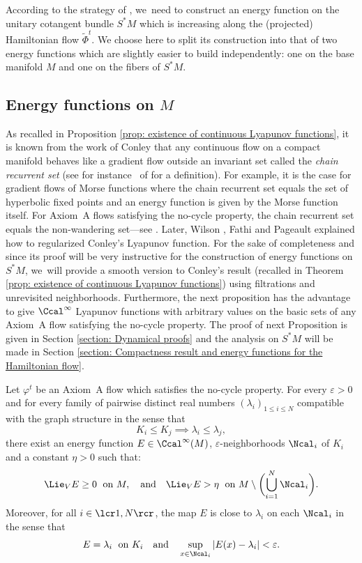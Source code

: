 According to the strategy of \cite{FS}, we~need to construct an energy function on the unitary cotangent bundle $S^*M$ which is increasing along the (projected) Hamiltonian flow $\widetilde{\Phi}^t$. We choose here to split its construction into that of two energy functions which are slightly easier to build independently: one on the base manifold $M$ and one on the fibers of $S^* M$.

\subsection{Energy functions on $M$}

As recalled in Proposition \ref{prop: existence of continuous Lyapunov functions}, it is known from the work of Conley \cite{conley} that any continuous flow on a compact manifold behaves like a gradient flow outside an invariant set called the \textit{chain recurrent set} (see for instance~\cite{palis-demelo} of \cite{FH} for a definition). For example, it is the case for gradient flows of Morse functions where the chain recurrent set equals the set of hyperbolic fixed points and an energy function is given by the Morse function itself. For Axiom~A flows satisfying the no-cycle property, the chain recurrent set equals the non-wandering set---see \cite[Th.\,5.3.47]{FH}. Later, Wilson \cite{wilson}, Fathi and Pageault \cite{fathi-pageault} explained how to regularized Conley's Lyapunov function. For the sake of completeness and since its proof will be very instructive for the construction of energy functions on $S^* M$, we~will provide a smooth version to Conley's result (recalled in Theorem \ref{prop: existence of continuous Lyapunov functions}) using filtrations and unrevisited neighborhoods. Furthermore, the next proposition has the advantage to give $\Ccal^{\infty}$ Lyapunov functions with arbitrary values on the basic sets of any Axiom~A flow satisfying the no-cycle property. The proof of next Proposition is given in Section \ref{section: Dynamical proofs} and the analysis on $S^*M$ will be made in Section \ref{section: Compactness result and energy functions for the Hamiltonian flow}.

\begin{prop}\label{prop energy function for Axiom A flows}
Let $\varphi^t$ be an Axiom~A flow which satisfies the no-cycle property. For every $\varepsilon > 0$ and for every family of pairwise distinct real numbers $(\lambda_i)_{1\leq i \leq N}$ compatible with the graph structure in the sense that
\[
K_i \leq K_j \implies \lambda_i \leq \lambda_j,
\]
there exist an energy function $E \in \Ccal^{\infty}(M)$, $\varepsilon$-neighborhoods $ \Ncal_i$ of $K_i$ and a constant $\eta > 0$ such that:
\[
\Lie_V E \geq 0\;\text{ on } M, \quad \text{and}\quad \Lie_V E > \eta \;\text{ on } M \setminus \biggl(\bigcup_{i = 1}^N \Ncal_i \biggr).
\]
Moreover, for all $i\in\lcr1,N\rcr$, the map $E$ is close to $\lambda_i$ on each $\Ncal_i$ in the sense that
\[
E = \lambda_i \;\text{ on } K_i \quad\text{and}\quad \sup_{x \in \Ncal_i} |E(x) - \lambda_i | < \varepsilon.
\]
\end{prop}

